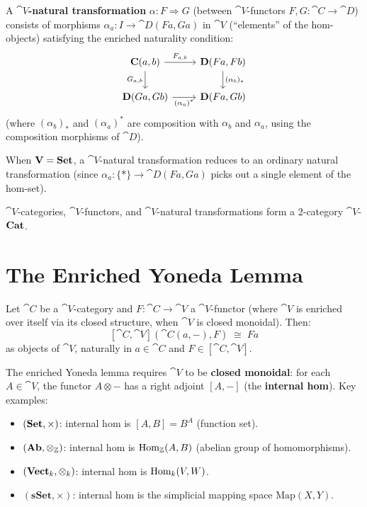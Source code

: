 \begin{definition}
A \textbf{$\cat{V}$-natural transformation} $\alpha: F \Rightarrow G$ (between $\cat{V}$-functors $F, G: \cat{C} \to \cat{D}$) consists of morphisms $\alpha_a: I \to \cat{D}(Fa, Ga)$ in $\cat{V}$ (``elements'' of the hom-objects) satisfying the enriched naturality condition:
\[
  \begin{tikzcd}
    \cat{C}(a,b) \arrow[r, "F_{a,b}"] \arrow[d, "G_{a,b}"'] & \cat{D}(Fa,Fb) \arrow[d, "(\alpha_b)_*"] \\
    \cat{D}(Ga,Gb) \arrow[r, "(\alpha_a)^*"'] & \cat{D}(Fa,Gb)
  \end{tikzcd}
\]
(where $(\alpha_b)_*$ and $(\alpha_a)^*$ are composition with $\alpha_b$ and $\alpha_a$, using the composition morphisms of $\cat{D}$).
\end{definition}

\begin{remark}
When $\mathbf{V} = \mathbf{Set}$, a $\cat{V}$-natural transformation reduces to an ordinary natural transformation (since $\alpha_a: \{*\} \to \cat{D}(Fa, Ga)$ picks out a single element of the hom-set).
\end{remark}

$\cat{V}$-categories, $\cat{V}$-functors, and $\cat{V}$-natural transformations form a 2-category $\cat{V}$-$\mathbf{Cat}$.

\section{The Enriched Yoneda Lemma}

\begin{theorem}
Let $\cat{C}$ be a $\cat{V}$-category and $F: \cat{C} \to \cat{V}$ a $\cat{V}$-functor (where $\cat{V}$ is enriched over itself via its closed structure, when $\cat{V}$ is closed monoidal). Then:
\[
  [\cat{C}, \cat{V}](\cat{C}(a,-), F) \;\cong\; Fa
\]
as objects of $\cat{V}$, naturally in $a \in \cat{C}$ and $F \in [\cat{C},\cat{V}]$.
\end{theorem}

The enriched Yoneda lemma requires $\cat{V}$ to be \textbf{closed monoidal}: for each $A \in \cat{V}$, the functor $A \otimes -$ has a right adjoint $[A, -]$ (the \textbf{internal hom}). Key examples:
\begin{itemize}
  \item $(\mathbf{Set}, \times)$: internal hom is $[A,B] = B^A$ (function set).
  \item $(\mathbf{Ab}, \otimes_\mathbb{Z})$: internal hom is $\operatorname{Hom}_\mathbb{Z}(A,B)$ (abelian group of homomorphisms).
  \item $(\mathbf{Vect}_k, \otimes_k)$: internal hom is $\operatorname{Hom}_k(V, W)$.
  \item $(\mathbf{sSet}, \times)$: internal hom is the simplicial mapping space $\mathrm{Map}(X,Y)$.
\end{itemize}

